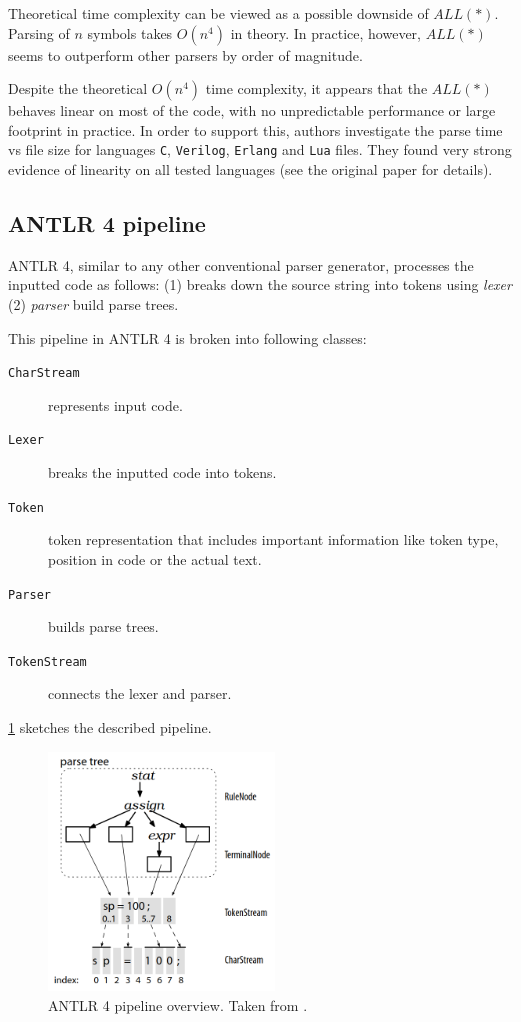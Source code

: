 Theoretical time complexity can be viewed as a possible downside of $ALL(*)$. Parsing of $n$ symbols takes $O(n^4)$ in theory. In practice, however, $ALL(*)$ seems to outperform other parsers by order of magnitude.

Despite the theoretical $O(n^4)$ time complexity, it appears that the $ALL(*)$ behaves linear on most of the code, with no unpredictable performance or large footprint in practice. In order to support this, authors investigate the parse time vs file size for languages \texttt{C}, \texttt{Verilog}, \texttt{Erlang} and \texttt{Lua} files. They found very strong evidence of linearity on all tested languages (see the original paper for details).

\subsection{ANTLR 4 pipeline}

ANTLR 4, similar to any other conventional parser generator, processes the inputted code as follows: (1) breaks down the source string into tokens using \textit{lexer} (2) \textit{parser} build parse trees. 

This pipeline in ANTLR 4 is broken into following classes: 

\begin{description}
	\item[\texttt{CharStream}] represents input code.
	\item[\texttt{Lexer}] breaks the inputted code into tokens.
	\item[\texttt{Token}] token representation that includes important information like token type, position in code or the actual text.
	\item[\texttt{Parser}] builds parse trees.
	\item[\texttt{TokenStream}] connects the lexer and parser.
\end{description}

\cref{antlr_pipeline} sketches the described pipeline.

\begin{figure}[H]
	\centering
	\includegraphics[width=6cm]{img/antlr_pipeline}
	\caption{ANTLR 4 pipeline overview. Taken from \cite{parr2013definitive}.}
	\label{antlr_pipeline}
\end{figure}

